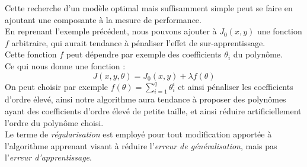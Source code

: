 \documentclass[10pt,a4paper]{report}
\begin{document}
	Cette recherche d'un modèle optimal mais suffisamment simple peut se faire en ajoutant une composante à la mesure de performance.\\
	En reprenant l'exemple précédent, nous pouvons ajouter à $J_0(x,y)$ une fonction $f$ arbitraire, qui aurait tendance à pénaliser l'effet de sur-apprentissage.\\
	Cette fonction $f$ peut dépendre par exemple des coefficients $\theta_i$ du polynôme.\\
	Ce qui nous donne une fonction :
	$$J(x,y,\theta) = J_0(x,y) + \lambda f(\theta)$$
	On peut choisir par exemple $f(\theta) = \sum_{i=1}^{q}{\theta_i^i}$ et ainsi pénaliser les coefficients d'ordre élevé, ainsi notre algorithme aura tendance à proposer des polynômes ayant des coefficients d'ordre élevé de petite taille, et ainsi réduire artificiellement l'ordre du polynôme choisi.\\
	Le terme de \emph{régularisation} est employé pour tout modification apportée à l'algorithme apprenant visant à réduire l'\emph{erreur de généralisation}, mais pas l'\emph{erreur d'apprentissage}.
	
\end{document}

